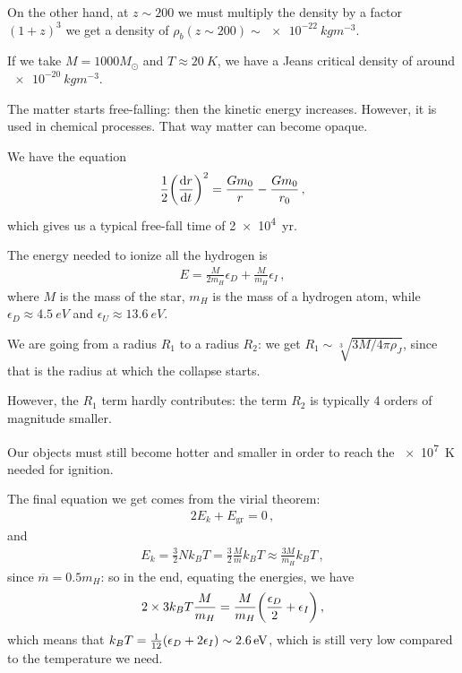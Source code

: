\documentclass[main.tex]{subfiles}
\begin{document}
On the other hand, at \(z \sim 200 \) we must multiply the density by a factor \((1+z)^3\) we get a density of \(\rho_{b} (z \sim 200) \sim \SI{e-22}{kg m^{-3}}\). 

If we take \(M = 1000 M_{\odot}\) and \(T \approx \SI{20}{K}\), we have a Jeans critical density of around \(\SI{e-20}{kg m^{-3}}\). 


The matter starts free-falling: then the kinetic energy increases. 
However, it is used in chemical processes. That way matter can become opaque. 

We have the equation 
%
\begin{align}
  \frac{1}{2} \qty(\dv{r}{t})^2 = \frac{G m_0 }{r} - \frac{G m_0 }{r_0 }
\,,
\end{align}
%
which gives us a typical free-fall time of \SI{2e4}{yr}. 

The energy needed to ionize all the hydrogen is 
%
\begin{align}
  E = \frac{M}{2 m_H} \epsilon_{D} + \frac{M}{m_H} \epsilon_{I}
\,,
\end{align}
%
where \(M\) is the mass of the star, \(m_H\) is the mass of a hydrogen atom, while \(\epsilon_{D} \approx \SI{4.5}{eV}\) and \(\epsilon_{U} \approx \SI{13.6}{eV}\). 

We are going from a radius \(R_1 \) to a radius \(R_2 \): we get \(R_1 \sim \sqrt[3]{3 M / 4 \pi \rho _J}\), since that is the radius at which the collapse starts. 

However, the \(R_1 \) term hardly contributes: the term \(R_2 \) is typically 4 orders of magnitude smaller. 

Our objects must still become hotter and smaller in order to reach the \SI{e7}{K} needed for ignition. 

The final equation we  get comes from the  virial theorem:
%
\begin{align}
  2E_{k} + E _{\text{gr}} =0
\,,
\end{align}
%
and 
%
\begin{align}
  E_k = \frac{3}{2} N k_B T = \frac{3}{2} \frac{M}{\overline{m}} k_B T \approx \frac{3M}{m_H} k_B T
\,,
\end{align}
%
since \(\overline{m} = 0.5 m_H\): so in the end, equating the energies, we have 
%
\begin{align}
  2 \times 3 k_B T \frac{M}{m_H }
  = \frac{M}{m_H} \qty(\frac{\epsilon_{D}}{2} + \epsilon_{I})
\,,
\end{align}
%
which means that \(k_B T = \frac{1}{12} \qty(\epsilon_{D} + 2 \epsilon_{I}) \sim \SI{2.6}{eV}\), which is still very low compared to the temperature we need. 
\end{document}
